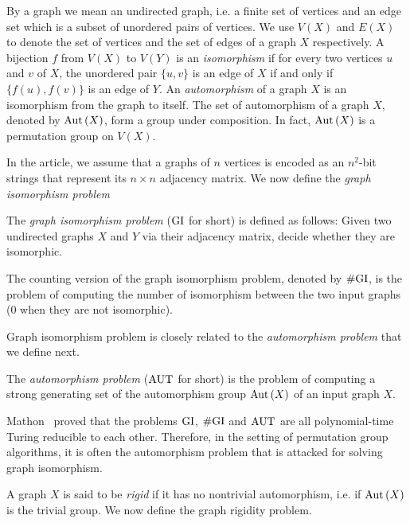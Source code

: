 \documentclass{article}
\begin{document}
By a graph we mean an undirected graph, i.e. a finite set of vertices
and an edge set which is a subset of unordered pairs of vertices. We
use $V(X)$ and $E(X)$ to denote the set of vertices and the set of
edges of a graph $X$ respectively. A bijection $f$ from $V(X)$ to
$V(Y)$ is an \emph{isomorphism} if for every two vertices $u$ and $v$
of $X$, the unordered pair $\{u,v\}$ is an edge of $X$ if and only if
$\{f(u), f(v)\}$ is an edge of $Y$. An \emph{automorphism} of a graph
$X$ is an isomorphism from the graph to itself. The set of
automorphism of a graph $X$, denoted by $\mathrm{Aut}\left(X\right)$, form a group under
composition. In fact, $\mathrm{Aut}\left(X\right)$ is a permutation group on $V(X)$.

In the article, we assume that a graphs of $n$ vertices is encoded as
an $n^2$-bit strings that represent its $n\times n$ adjacency
matrix. We now define the \emph{graph isomorphism problem}

\begin{problem}
  The \emph{graph isomorphism problem} ($\mathrm{GI}$ for short) is defined as
  follows: Given two undirected graphs $X$ and $Y$ via their adjacency
  matrix, decide whether they are isomorphic.

  The counting version of the graph isomorphism problem, denoted by
  $\# \mathrm{GI}$, is the problem of computing the number of isomorphism
  between the two input graphs (0 when they are not isomorphic).
\end{problem}

Graph isomorphism problem is closely related to the \emph{automorphism
  problem} that we define next.

\begin{problem}
  The \emph{automorphism problem} ($\mathrm{AUT}_{}$ for short) is the problem of
  computing a strong generating set of the automorphism group
  $\mathrm{Aut}\left(X\right)$ of an input graph $X$.
\end{problem}



Mathon~\cite{mathon79note} proved that the problems $\mathrm{GI}$, $\# \mathrm{GI}$
and $\mathrm{AUT}_{}$ are all polynomial-time Turing reducible to each
other. Therefore, in the setting of permutation group algorithms, it
is often the automorphism problem that is attacked for solving graph
isomorphism.

A graph $X$ is said to be \emph{rigid} if it has no nontrivial
automorphism, i.e. if $\mathrm{Aut}\left(X\right)$ is the trivial group. We now define
the graph rigidity problem.
\end{document}

